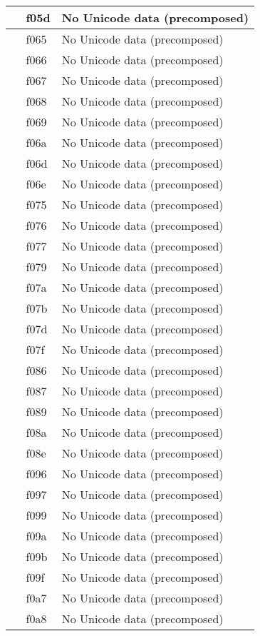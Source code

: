 \documentclass[12pt,letterpaper,openany]{book}
\begin{document}
\begin{center}
\begin{supertabular}{|m{0.25in}|m{0.5in}|m{4in}|}
 & f05d & No Unicode data (precomposed)\\\hline
 & f065 & No Unicode data (precomposed)\\\hline
 & f066 & No Unicode data (precomposed)\\\hline
 & f067 & No Unicode data (precomposed)\\\hline
 & f068 & No Unicode data (precomposed)\\\hline
 & f069 & No Unicode data (precomposed)\\\hline
 & f06a & No Unicode data (precomposed)\\\hline
 & f06d & No Unicode data (precomposed)\\\hline
 & f06e & No Unicode data (precomposed)\\\hline
 & f075 & No Unicode data (precomposed)\\\hline
 & f076 & No Unicode data (precomposed)\\\hline
 & f077 & No Unicode data (precomposed)\\\hline
 & f079 & No Unicode data (precomposed)\\\hline
 & f07a & No Unicode data (precomposed)\\\hline
 & f07b & No Unicode data (precomposed)\\\hline
 & f07d & No Unicode data (precomposed)\\\hline
 & f07f & No Unicode data (precomposed)\\\hline
 & f086 & No Unicode data (precomposed)\\\hline
 & f087 & No Unicode data (precomposed)\\\hline
 & f089 & No Unicode data (precomposed)\\\hline
 & f08a & No Unicode data (precomposed)\\\hline
 & f08e & No Unicode data (precomposed)\\\hline
 & f096 & No Unicode data (precomposed)\\\hline
 & f097 & No Unicode data (precomposed)\\\hline
 & f099 & No Unicode data (precomposed)\\\hline
 & f09a & No Unicode data (precomposed)\\\hline
 & f09b & No Unicode data (precomposed)\\\hline
 & f09f & No Unicode data (precomposed)\\\hline
 & f0a7 & No Unicode data (precomposed)\\\hline
 & f0a8 & No Unicode data (precomposed)\\\hline

\end{supertabular}
\end{center}
\end{document}
